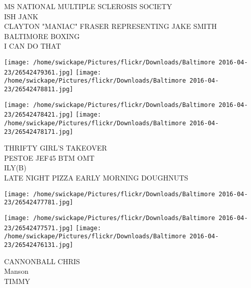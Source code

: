 \documentclass[10pt,letterpaper]{article}
\begin{document}
MS NATIONAL MULTIPLE SCLEROSIS SOCIETY\\
ISH JANK\\
CLAYTON "MANIAC" FRASER REPRESENTING JAKE SMITH BALTIMORE BOXING\\
I CAN DO THAT
\pagebreak

\texttt{[image: /home/swickape/Pictures/flickr/Downloads/Baltimore 2016-04-23/26542479361.jpg]}
\texttt{[image: /home/swickape/Pictures/flickr/Downloads/Baltimore 2016-04-23/26542478811.jpg]}

\texttt{[image: /home/swickape/Pictures/flickr/Downloads/Baltimore 2016-04-23/26542478421.jpg]}
\texttt{[image: /home/swickape/Pictures/flickr/Downloads/Baltimore 2016-04-23/26542478171.jpg]}

THRIFTY GIRL'S TAKEOVER\\
PESTOE JEF45 BTM OMT\\
ILY(B)\\
LATE NIGHT PIZZA EARLY MORNING DOUGHNUTS
\pagebreak

\texttt{[image: /home/swickape/Pictures/flickr/Downloads/Baltimore 2016-04-23/26542477781.jpg]}

\vspace{0.25in}
\texttt{[image: /home/swickape/Pictures/flickr/Downloads/Baltimore 2016-04-23/26542477571.jpg]}
\texttt{[image: /home/swickape/Pictures/flickr/Downloads/Baltimore 2016-04-23/26542476131.jpg]}

CANNONBALL CHRIS\\
Manson\\
TIMMY
\pagebreak
\end{document}
